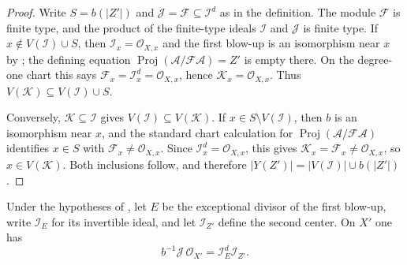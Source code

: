 \begin{proof}
  \leanok
  Write $S=b(|Z'|)$ and $\mathcal J=\mathcal F\subseteq\mathcal I^d$ as in
  the definition.  The module $\mathcal F$ is finite type, and the product of
  the finite-type ideals $\mathcal I$ and $\mathcal J$ is finite type.  If
  $x\notin V(\mathcal I)\cup S$, then $\mathcal I_x=\mathcal O_{X,x}$ and
  the first blow-up is an isomorphism near $x$ by
  ; the defining equation
  $\operatorname{Proj}(\mathcal A/\mathcal F\mathcal A)=Z'$ is empty there.
  On the degree-one chart this says $\mathcal F_x=\mathcal I_x^d=\mathcal O_{X,x}$,
  hence $\mathcal K_x=\mathcal O_{X,x}$.  Thus
  $V(\mathcal K)\subseteq V(\mathcal I)\cup S$.

  Conversely, $\mathcal K\subseteq\mathcal I$ gives
  $V(\mathcal I)\subseteq V(\mathcal K)$.  If $x\in S\setminus V(\mathcal I)$,
  then $b$ is an isomorphism near $x$, and the standard chart calculation for
  $\operatorname{Proj}(\mathcal A/\mathcal F\mathcal A)$ identifies
  $x\in S$ with $\mathcal F_x\ne\mathcal O_{X,x}$.  Since
  $\mathcal I_x^d=\mathcal O_{X,x}$, this gives
  $\mathcal K_x=\mathcal F_x\ne\mathcal O_{X,x}$, so
  $x\in V(\mathcal K)$.  Both inclusions follow, and therefore
  $|Y(Z')|=|V(\mathcal I)|\cup b(|Z'|)$.
\end{proof}


\begin{lemma}
  \label{lemma:nagata-composition-extended-ideal-equality}
  \leanok

  Under the hypotheses of
  , let $E$ be the exceptional
  divisor of the first blow-up, write $\mathcal I_E$ for its invertible ideal,
  and let $\mathcal I_{Z'}$ define the second center.  On $X'$ one has
  \[
    b^{-1}\mathcal J\,\mathcal O_{X'}
      =\mathcal I_E^d\mathcal I_{Z'}.
  \]
\end{lemma}

